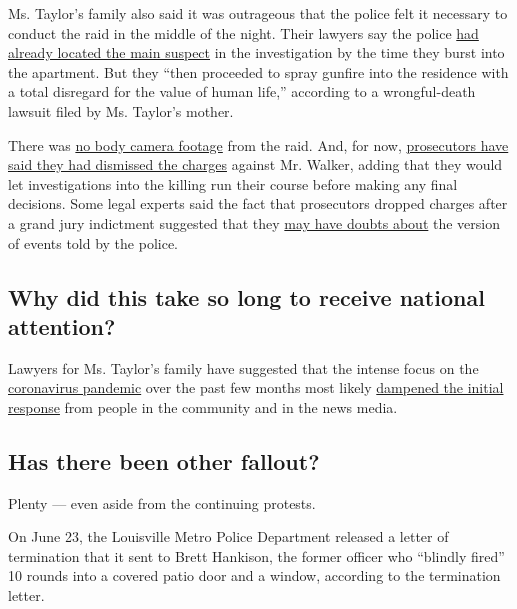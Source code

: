 Ms. Taylor's family also said it was outrageous that the police felt it
necessary to conduct the raid in the middle of the night. Their lawyers
say the police
\href{https://www.nytimes.com/2020/05/14/us/breonna-taylor-louisville-shooting.html}{had
already located the main suspect} in the investigation by the time they
burst into the apartment. But they ``then proceeded to spray gunfire
into the residence with a total disregard for the value of human life,''
according to a wrongful-death lawsuit filed by Ms. Taylor's mother.

There was
\href{https://www.facebook.com/LMPD.ky/videos/206839417221050/}{no body
camera footage} from the raid. And, for now,
\href{https://www.nytimes.com/2020/05/22/us/Breonna-Taylor-Kenneth-Walker.html}{prosecutors
have said they had dismissed the charges} against Mr. Walker, adding
that they would let investigations into the killing run their course
before making any final decisions. Some legal experts said the fact that
prosecutors dropped charges after a grand jury indictment suggested that
they
\href{https://www.nytimes.com/2020/05/22/us/Breonna-Taylor-Kenneth-Walker.html}{may
have doubts about} the version of events told by the police.

\hypertarget{why-did-this-take-so-long-to-receive-national-attention}{%
\subsection{Why did this take so long to receive national
attention?}\label{why-did-this-take-so-long-to-receive-national-attention}}

Lawyers for Ms. Taylor's family have suggested that the intense focus on
the \href{https://www.nytimes.com/news-event/coronavirus}{coronavirus
pandemic} over the past few months most likely
\href{https://www.courier-journal.com/story/news/crime/2020/05/12/mother-breonna-taylor-louisville-emt-shot-police-speaks-out/3116777001/}{dampened
the initial response} from people in the community and in the news
media.

\hypertarget{has-there-been-other-fallout}{%
\subsection{Has there been other
fallout?}\label{has-there-been-other-fallout}}

Plenty --- even aside from the continuing protests.

On June 23, the Louisville Metro Police Department released a letter of
termination that it sent to Brett Hankison, the former officer who
``blindly fired'' 10 rounds into a covered patio door and a window,
according to the termination letter.

